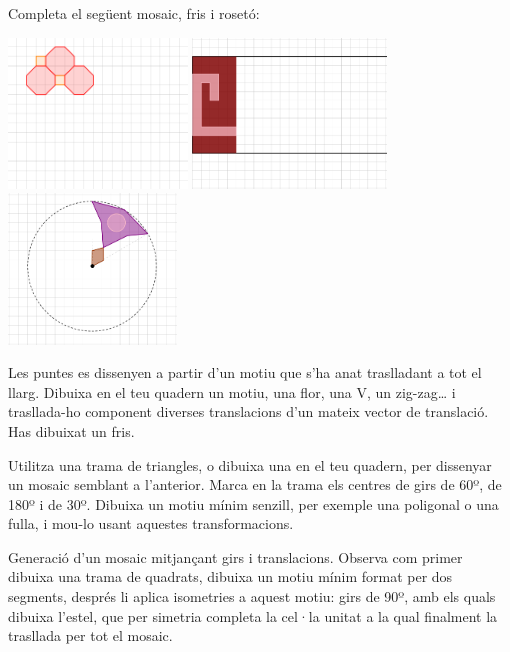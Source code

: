 \begin{mylist}
 
\exer \spen Completa el següent mosaic, fris i rosetó:
\begin{center}
	\includegraphics[height=4cm]{img-10/completa1}
	\includegraphics[height=4cm]{img-10/completa2}
	\includegraphics[height=4cm]{img-10/completa3}
\end{center}
	
\exer  Les puntes es dissenyen a partir d'un motiu que s'ha anat traslladant a tot el llarg. Dibuixa en el teu quadern un motiu, una flor, una V, un zig-zag{\dots} i trasllada-ho component diverses translacions d'un mateix vector de translació. Has dibuixat un fris.

 
\exer  Utilitza una trama de triangles, o dibuixa una en el teu quadern, per dissenyar un mosaic semblant a l'anterior. Marca en la trama els centres de girs de 60º, de 180º i de 30º. Dibuixa un motiu mínim senzill, per exemple una poligonal o una fulla, i mou-lo usant aquestes transformacions.

	\exer   Generació d'un mosaic mitjançant girs i translacions. Observa com primer dibuixa una trama de quadrats, dibuixa un motiu mínim format per dos segments, després li aplica isometries a aquest motiu: girs de 90º, amb els quals dibuixa l'estel, que per simetria completa la cel·la unitat a la qual finalment la trasllada per tot el mosaic. 
	

\end{mylist}
